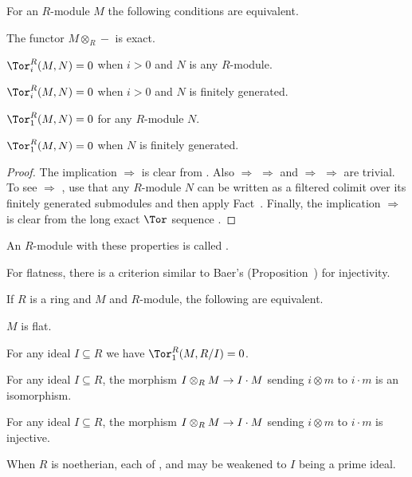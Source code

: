 \documentclass[a4paper,parskip=half,numbers=enddot, DIV=12]{scrreprt}
\begin{document}
\begin{prop}
	For an $R$-module $M$ the following conditions are equivalent.
	\begin{alphanumerate}
		\item The functor $M\otimes _R-$ is exact.
		\item $\Tor_i^R(M,N)=0$ when $i>0$ and $N$ is any $R$-module.
		\item $\Tor_i^R(M,N)=0$ when $i>0$ and $N$ is finitely generated.
		\item $\Tor_1^R(M,N)=0$ for any $R$-module $N$.
		\item $\Tor_1^R(M,N)=0$ when $N$ is finitely generated.
	\end{alphanumerate}
\end{prop}
\begin{proof}
	The implication  $\Rightarrow$  is clear from . Also  $\Rightarrow$  $\Rightarrow$  and  $\Rightarrow$  $\Rightarrow$  are trivial. To see  $\Rightarrow$ , use that any $R$-module $N$ can be written as a filtered colimit over its finitely generated submodules and then apply Fact~. Finally, the implication  $\Rightarrow$  is clear from the long exact $\Tor$ sequence . 
\end{proof}
\begin{defi}
	An $R$-module with these properties is called .
\end{defi}
For flatness, there is a criterion similar to Baer's (Proposition~) for injectivity.
\begin{prop}
	If $R$ is a ring and $M$ and $R$-module, the following are equivalent.
	\begin{alphanumerate}
		\item $M$ is flat.
		\item For any ideal $I\subseteq R$ we have $\Tor_1^R(M,R/I)=0$.
		\item For any ideal $I\subseteq R$, the morphism $I\otimes_RM\morphism I\cdot M$ sending $i\otimes m$ to $i\cdot m$ is an isomorphism.
		\item For any ideal $I\subseteq R$, the morphism $I\otimes_RM\morphism I\cdot M$ sending $i\otimes m$ to $i\cdot m$ is injective.
	\end{alphanumerate}
	When $R$ is noetherian, each of ,  and  may be weakened to $I$ being a prime ideal.
\end{prop}
\end{document}
